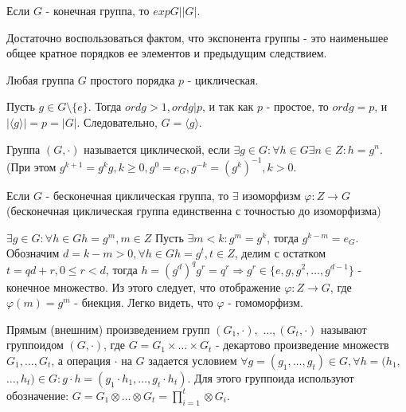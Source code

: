 \begin{sledsv}
  Если $G$ - конечная группа, то $exp G | |G|$.
  \begin{dokvo}
    Достаточно воспользоваться фактом, что экспонента группы - это наименьшее общее кратное порядков ее элементов и
    предыдущим следствием.
  \end{dokvo}
\end{sledsv}

\begin{sledsv}
  Любая группа $G$ простого порядка $p$ - циклическая.
  \begin{dokvo}
    Пусть $g \in G \setminus \{e\}$. Тогда $ord g > 1, ord g | p$, и так как $p$ - простое,
    то $ord g = p$, и $|\langle g \rangle| = p = |G|$. Следовательно, $G = \langle g \rangle$.
  \end{dokvo}
\end{sledsv}

\begin{defs}
  Группа $(G,\cdot)$ называется циклической, если $\exists g \in G : \forall h \in G \exists n \in Z : h = g^n$.
  (При этом $g^{k+1} = g^kg, k \geqslant 0, g^0 = e_G, g^{-k} = (g^k)^{-1}, k > 0$.
\end{defs}

\begin{proofs}
	Если $G$ - бесконечная циклическая группа, то $\exists$ изоморфизм $\varphi : Z \to G$
  (бесконечная циклическая группа единственна с точностью до изоморфизма)
	\begin{dokvo}
    $\exists g \in G : \forall h \in G h = g^m, m \in Z$
    Пусть $\exists m < k : g^m = g^k$, тогда $g^{k-m} = e_G$.
    Обозначим $d=k-m > 0, \forall h \in G h = g^t, t \in Z$, делим с остатком
    $t = qd + r, 0 \leqslant r < d$, тогда $h=(g^d)^qg^r=q^r \Rightarrow g^r \in \{e, g, g^2, \ldots, g^{d-1}\}$ -
    конечное множество. Из этого следует, что отображение $\varphi : Z \to G$, где $\varphi(m)=g^m$ - биекция.
    Легко видеть, что $\varphi$ - гомоморфизм.
	\end{dokvo}
\end{proofs}

\begin{defs}
  Прямым (внешним) произведением групп $(G_1,\cdot),$ $\ldots, (G_t, \cdot)$ называют группоидом $(G,\cdot)$, где
  $G = G_1 \times \ldots \times G_t$ - декартово произведение множеств $G_1, \ldots, G_t$, а операция $\cdot$ на $G$ задается
  условием $\forall g = (g_1, \ldots, g_t) \in G, \forall h = (h_1,$ $\ldots, h_t) \in G : g \cdot h = (g_1 \cdot h_1, \ldots, g_t \cdot h_t)$.
  Для этого группоида используют обозначение: $G = G_1 \otimes \ldots \otimes G_t = \prod_{i=1}^{t} \otimes G_i$.
\end{defs}

